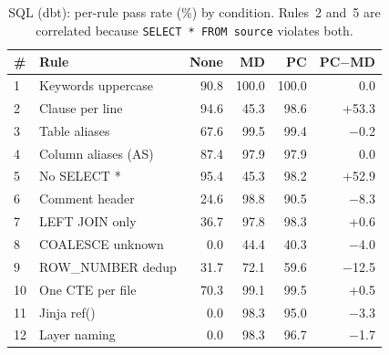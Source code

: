 \documentclass[sigconf,nonacm]{acmart}
\begin{document}
\begin{table}[h]
\caption{SQL (dbt): per-rule pass rate (\%) by condition. Rules~2 and~5 are
correlated because \texttt{SELECT * FROM source} violates both.}
\label{tab:per-rule-sql}
\centering\small
\begin{tabular}{llrrrr}
\toprule
\textbf{\#} & \textbf{Rule} & \textbf{None} & \textbf{MD} & \textbf{PC} & \textbf{PC$-$MD} \\
\midrule
1  & Keywords uppercase      &  90.8 & 100.0 & 100.0 &    0.0 \\
2  & Clause per line         &  94.6 &  45.3 &  98.6 &  +53.3 \\
3  & Table aliases           &  67.6 &  99.5 &  99.4 &   $-$0.2 \\
4  & Column aliases (AS)     &  87.4 &  97.9 &  97.9 &    0.0 \\
5  & No SELECT *             &  95.4 &  45.3 &  98.2 &  +52.9 \\
6  & Comment header          &  24.6 &  98.8 &  90.5 &   $-$8.3 \\
7  & LEFT JOIN only          &  36.7 &  97.8 &  98.3 &   +0.6 \\
8  & COALESCE unknown        &   0.0 &  44.4 &  40.3 &   $-$4.0 \\
9  & ROW\_NUMBER dedup       &  31.7 &  72.1 &  59.6 &  $-$12.5 \\
10 & One CTE per file        &  70.3 &  99.1 &  99.5 &   +0.5 \\
11 & Jinja ref()             &   0.0 &  98.3 &  95.0 &   $-$3.3 \\
12 & Layer naming            &   0.0 &  98.3 &  96.7 &   $-$1.7 \\
\bottomrule
\end{tabular}
\end{table}
\end{document}
